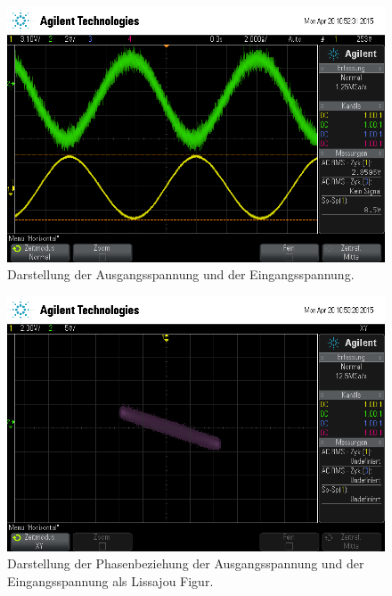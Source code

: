 \begin{figure}[!h]
    \centering
    \includegraphics[width=0.8\linewidth]{data/scope_2.png}
    \caption{Darstellung der Ausgangsspannung und der Eingangsspannung.}
    \label{fig:phase_verlauf}
\end{figure}

\begin{figure}[!h]
    \centering
    \includegraphics[width=0.8\linewidth]{data/scope_3.png}
    \caption{Darstellung der Phasenbeziehung der Ausgangsspannung und der Eingangsspannung als Lissajou Figur.}
    \label{fig:phase_liss}
\end{figure}